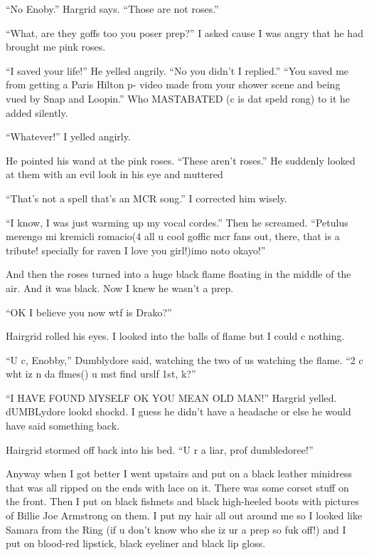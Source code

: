 \enquote{No Enoby.} Hargrid says. \enquote{Those are not roses.}

\enquote{What, are they goffs too you poser prep?} I asked cause I was angry that he had brought me pink roses.

\enquote{I saved your life!} He yelled angrily. \enquote{No you didn't I replied.} \enquote{You saved me from getting a Paris Hilton p- video made from your shower scene and being vued by Snap and Loopin.} Who MASTABATED (c is dat speld rong) to it he added silently.

\enquote{Whatever!} I yelled angirly.

He pointed his wand at the pink roses. \enquote{These aren't roses.} He suddenly looked at them with an evil look in his eye and muttered 

\enquote{That's not a spell that's an MCR song.} I corrected him wisely.

\enquote{I know, I was just warming up my vocal cordes.} Then he screamed. \enquote{Petulus merengo mi kremicli romacio(4 all u cool gof\-fic mcr fans out, there, that is a tribute! specially for raven I love you girl!)imo noto okayo!}

And then the roses turned into a huge black flame floating in the middle of the air. And it was black. Now I knew he wasn't a prep.

\enquote{OK I believe you now wtf is Drako?}

Hairgrid rolled his eyes. I looked into the balls of flame but I could c nothing.

\begin{sloppypar}
    \enquote{U c, Enobby,} Dumblydore said, watching the two of us watching the flame. \enquote{2 c wht iz n da flmes() u mst find urslf 1st, k?}
\end{sloppypar}

\enquote{I HAVE FOUND MYSELF OK YOU MEAN OLD MAN\@!} Hargrid yelled. dUMBLydore lookd shockd. I guess he didn't have a headache or else he would have said something back.

Hairgrid stormed off back into his bed. \enquote{U r a liar, prof dumbledoree!}

Anyway when I got better I went upstairs and put on a black leather minidress that was all ripped on the ends with lace on it. There was some corset stuff on the front. Then I put on black fishnets and black high-heeled boots with pictures of Billie Joe Armstrong on them. I put my hair all out around me so I looked like Samara from the Ring (if u don't know who she iz ur a prep so fuk off!) and I put on blood-red lipstick, black eyeliner and black lip gloss.

